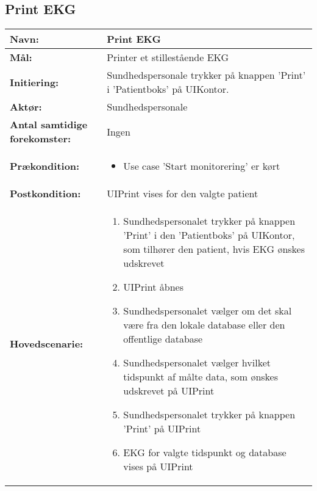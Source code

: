 \subsection{Print EKG}
\begin{table}[H]
\begin{tabular}{|l|p{10cm}|}
\hline
\textbf{Navn:} & \textbf{Print EKG}\\\hline
\textbf{Mål:} & Printer et stillestående EKG  \\\hline
\textbf{Initiering:} & Sundhedspersonale trykker på knappen 'Print' i 'Patientboks' på UIKontor.
 \\\hline
\textbf{Aktør:} & Sundhedspersonale \\\hline
\textbf{Antal samtidige forekomster:} & Ingen \\\hline
\textbf{Prækondition:} & \begin{itemize}[label=$\circ$]
\item{Use case 'Start monitorering' er kørt  }
\end{itemize}
\\\hline
\textbf{Postkondition:} & UIPrint vises for den valgte patient \\\hline
\textbf{Hovedscenarie:} & 
{\begin{enumerate}
\item{Sundhedspersonalet trykker på knappen 'Print' i den  'Patientboks' på UIKontor, som tilhører den patient, hvis EKG ønskes udskrevet }
\item{UIPrint åbnes}
\item{Sundhedspersonalet vælger om det skal være fra den lokale database eller den offentlige database}
\item{Sundhedspersonalet vælger hvilket tidspunkt af målte data, som ønskes udskrevet på UIPrint}
\item{Sundhedspersonalet trykker på knappen 'Print' på UIPrint}
\item{EKG for valgte tidspunkt og database vises på UIPrint}
\end{enumerate}}\\\hline
\end{tabular}
\end{table}

